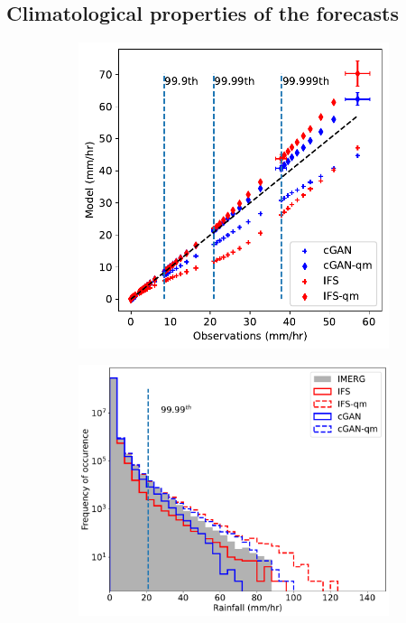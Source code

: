 \documentclass{article}
\begin{document}
\subsection{Climatological properties of the forecasts}
\label{sec:climatologic}
\begin{figure}[!ht]
     \centering
     \begin{subfigure}[h]{0.45\textwidth}
         \includegraphics[width=\textwidth]{images/quantiles_total_final-nologs_217600.pdf}
         \caption{}
         \centering
     \end{subfigure}
     \hfill
     \begin{subfigure}[h]{0.5\textwidth}
         \includegraphics[width=\textwidth]{images/histograms_final-nologs_217600.pdf}

\end{subfigure}
\end{figure}
\end{document}
